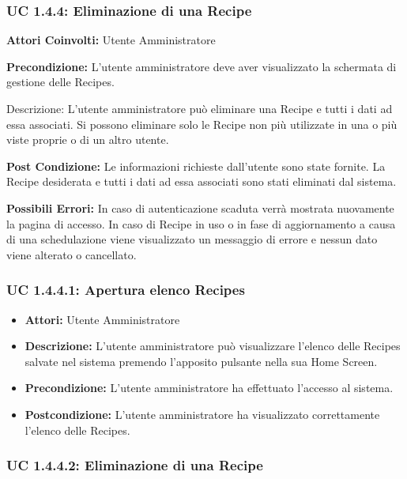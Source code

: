 \subsubsection{UC 1.4.4: Eliminazione di una Recipe}

\begin{itemize}
\textbf{Attori Coinvolti:}
Utente Amministratore

\textbf{Precondizione:}
L'utente amministratore deve aver visualizzato la schermata di gestione delle Recipes.

Descrizione:
L'utente amministratore può eliminare una Recipe e tutti i dati ad essa associati.
Si possono eliminare solo le Recipe non più utilizzate in una o più viste proprie o di un altro utente.    

\textbf{Post Condizione:}
Le informazioni richieste dall'utente sono state fornite.
La Recipe desiderata e tutti i dati ad essa associati sono stati eliminati dal sistema.

\textbf{Possibili Errori:}
In caso di autenticazione scaduta verrà mostrata nuovamente la pagina di accesso.
In caso di Recipe in uso o in fase di aggiornamento a causa di una schedulazione viene visualizzato un messaggio di errore e nessun dato viene alterato o cancellato.
\end{itemize}

\subsubsection{UC 1.4.4.1: Apertura elenco Recipes}

\begin{itemize}
\item \textbf{Attori:} Utente Amministratore
\item \textbf{Descrizione:} L'utente amministratore può visualizzare l'elenco delle Recipes salvate nel sistema premendo l'apposito pulsante nella sua Home Screen.
\item \textbf{Precondizione:} L'utente amministratore ha effettuato l'accesso al sistema.
\item \textbf{Postcondizione:} L'utente amministratore ha visualizzato correttamente l'elenco delle Recipes.
\end{itemize}

\subsubsection{UC 1.4.4.2: Eliminazione di una Recipe}

